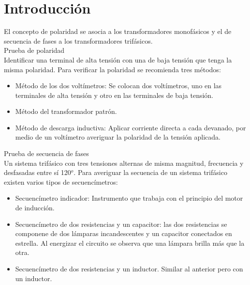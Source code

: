 \documentclass[]{article}
\begin{document}
	
	 
	

	
	
		
	\section{Introducción}
	
	El concepto de polaridad se asocia a los transformadores monofásicos y el de secuencia de fases a los transformadores trifásicos.\\
	Prueba de polaridad\\
	Identificar una terminal de alta tensión con una de baja tensión que tenga la misma polaridad. Para verificar la polaridad se recomienda tres métodos:\\
	
	\begin{itemize}
		\item 	Método de los dos voltímetros: Se colocan dos voltímetros, uno en las terminales de alta tensión y otro en las terminales de baja tensión.
			\item Método del transformador patrón.
			\item Método de descarga inductiva: Aplicar corriente directa a cada devanado, por medio de un voltímetro averiguar la polaridad de la tensión aplicada.
	\end{itemize}
	

	
	
	Prueba de secuencia de fases\\
	Un sistema trifásico con tres tensiones alternas de misma magnitud, frecuencia y desfasadas entre sí 120$^o$. Para averiguar la secuencia de un sistema trifásico existen varios tipos de secuencímetros:\cite{Angelo-kun2015}\\
	
	\begin{itemize}
		\item 	Secuencímetro indicador: Instrumento que trabaja con el principio del motor de inducción.
		\item Secuencímetro de dos resistencias y un capacitor: las dos resistencias se componene de dos lámparas incandescentes y un capacitor conectados en estrella. Al energizar el circuito se observa que una lámpara brilla más que la otra.
		\item Secuencímetro de dos resistencias y un inductor. Similar al anterior pero con un inductor.
	\end{itemize}
\end{document}

